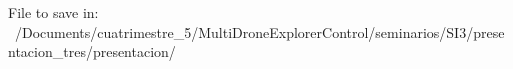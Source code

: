 File to save in: ~/Documents/cuatrimestre_5/MultiDroneExplorerControl/seminarios/SI3/presentacion_tres/presentacion/